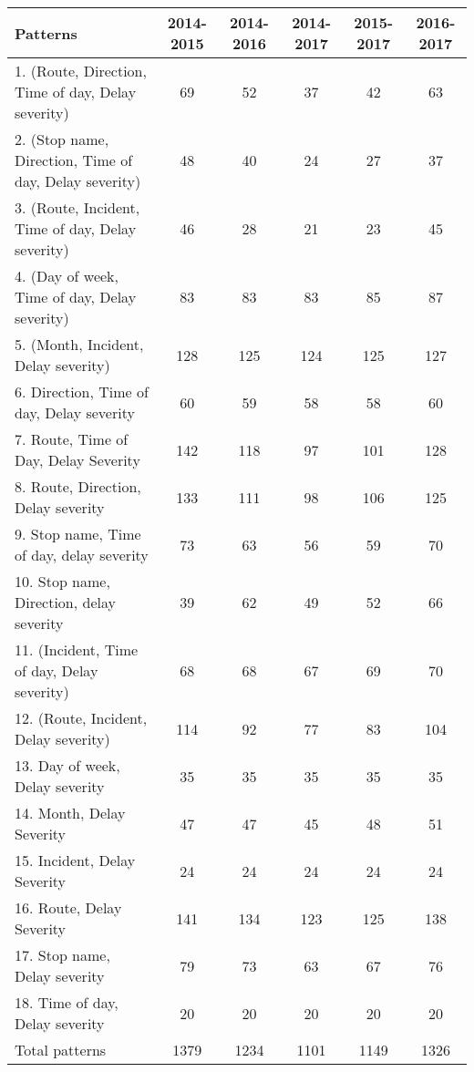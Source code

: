 \documentclass{article}
\begin{document}
\begin{table}
\centering
\hspace*{-1cm}\begin{tabular}{|l|c|c|c|c|c|}
\hline
Patterns&2014-2015&2014-2016&2014-2017&2015-2017&2016-2017 \\ [0.5ex]
\hline
\hline
1. (Route, Direction, Time of day, Delay severity)&69&52&37&42&63 \\
\hline
2. (Stop name, Direction, Time of day, Delay severity)&48&40&24&27&37 \\
\hline
3. (Route, Incident, Time of day, Delay severity)&46&28&21&23&45 \\
\hline
4. (Day of week, Time of day, Delay severity)&83&83&83&85&87 \\
\hline
5. (Month, Incident, Delay severity)&128&125&124&125&127 \\
\hline
6. Direction, Time of day, Delay severity&60&59&58&58&60 \\
\hline
7. Route, Time of Day, Delay Severity&142&118&97&101&128 \\
\hline
8. Route, Direction, Delay severity&133&111&98&106&125 \\
\hline
9. Stop name, Time of day, delay severity&73&63&56&59&70 \\
\hline
10. Stop name, Direction, delay severity&39&62&49&52&66 \\
\hline
11. (Incident, Time of day, Delay severity)&68&68&67&69&70 \\
\hline
12. (Route, Incident, Delay severity)&114&92&77&83&104 \\
\hline
13. Day of week, Delay severity&35&35&35&35&35 \\
\hline
14. Month, Delay Severity&47&47&45&48&51 \\
\hline
15. Incident, Delay Severity&24&24&24&24&24 \\
\hline
16. Route, Delay Severity&141&134&123&125&138 \\
\hline
17. Stop name, Delay severity&79&73&63&67&76 \\
\hline
18. Time of day, Delay severity&20&20&20&20&20 \\ [0.5ex]
\hline
\hline
Total patterns&1379&1234&1101&1149&1326 \\
\hline
\end{tabular}\hspace*{-1cm}
\end{table}


\end{document}
